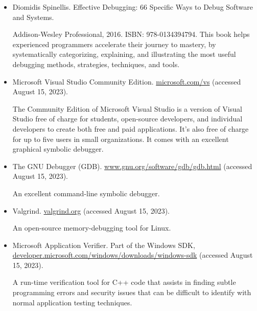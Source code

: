 
\begin{itemize}
\item
Diomidis Spinellis. Effective Debugging: 66 Specific Ways to Debug Software and Systems.

Addison-Wesley Professional, 2016. ISBN: 978-0134394794.
This book helps experienced programmers accelerate their journey to mastery, by systematically categorizing, explaining, and illustrating the most useful debugging methods, strategies, techniques, and tools.

\item
Microsoft Visual Studio Community Edition. \url{microsoft.com/vs} (accessed August 15, 2023).

The Community Edition of Microsoft Visual Studio is a version of Visual Studio free of charge for students, open-source developers, and individual developers to create both free and paid applications. It’s also free of charge for up to five users in small organizations. It comes with an excellent graphical symbolic debugger.

\item
The GNU Debugger (GDB). \url{www.gnu.org/software/gdb/gdb.html} (accessed August 15, 2023).

An excellent command-line symbolic debugger.

\item
Valgrind. \url{valgrind.org} (accessed August 15, 2023).

An open-source memory-debugging tool for Linux.

\item
Microsoft Application Verifier. Part of the Windows SDK, \url{developer.microsoft.com/windows/downloads/windows-sdk} (accessed August 15, 2023).

A run-time verification tool for C++ code that assists in finding subtle programming errors and security issues that can be difficult to identify with normal application testing techniques.
\end{itemize}